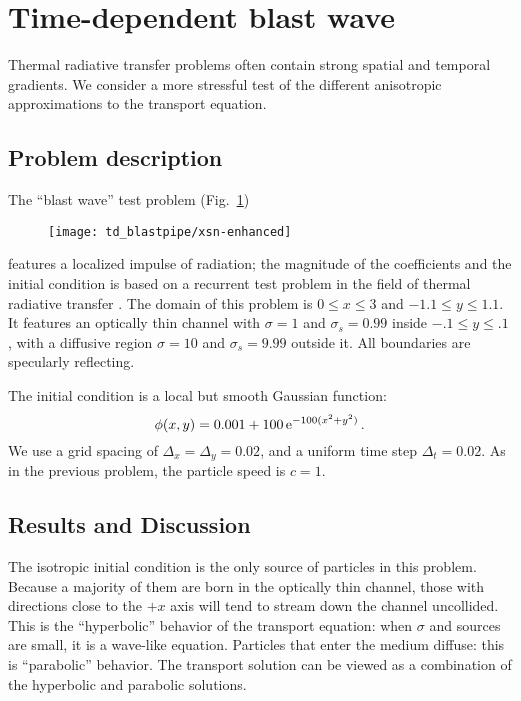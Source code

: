 \clearpage
\section{Time-dependent blast wave}\label{sec:tdBlastwave}

Thermal radiative transfer problems often contain strong spatial and temporal
gradients. We consider a more stressful test of the different anisotropic
approximations to the transport equation.

\subsection{Problem description}

The ``blast wave'' test problem (Fig.~\ref{fig:tdBlastwaveXsn})
%
\begin{figure}[htb]
  \centering
  \texttt{[image: td\_blastpipe/xsn-enhanced]}
  \label{fig:tdBlastwaveXsn}
\end{figure}
%
features a localized impulse of radiation; the
magnitude of the coefficients and the initial condition is based on a recurrent
test problem in the field
of thermal radiative transfer \cite{Kno1999a,Kno2001,Rau2005,Ols2007}. The
domain of this problem is $0 \le x \le 3$ and $-1.1 \le y \le 1.1$.
It features an optically thin channel with $\sigma=1$ and $\sigma_s=0.99$ inside
$-.1 \le y \le .1$, with a diffusive region $\sigma=10$ and $\sigma_s=9.99$
outside it. All boundaries are specularly reflecting.

The initial condition is a local but smooth Gaussian function:
\begin{equation*}
  \phi(x,y) = 0.001 + 100 \mathop{}\!\mathrm{e}^{-100 (x^2 + y^2) }\,.
\end{equation*}
We use a grid spacing of $\Delta_x=\Delta_y=0.02$, and a uniform time step
$\Delta_t=0.02$. As in the previous problem, the particle speed is $c=1$.

\subsection{Results and Discussion}

The isotropic initial condition is the only source of particles in this
problem. Because a majority of them are born in the optically thin channel,
those with directions close to the $+x$ axis will tend to stream down the
channel uncollided. This is the ``hyperbolic'' behavior of the transport
equation: when $\sigma$ and sources are small, it is a wave-like equation.
Particles that enter the medium diffuse: this is ``parabolic'' behavior. The
transport solution can be viewed as a combination of the hyperbolic and
parabolic solutions.

